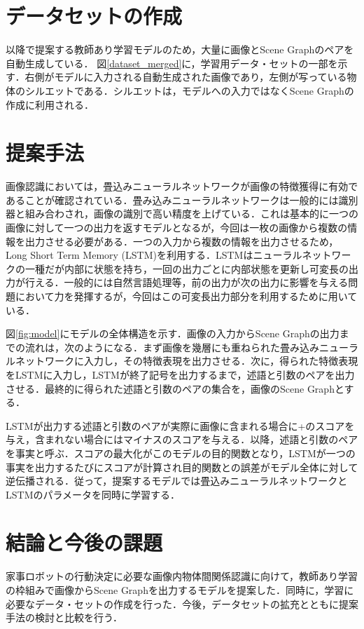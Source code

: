 \section{データセットの作成}
以降で提案する教師あり学習モデルのため，大量に画像とScene Graphのペアを自動生成している．
図\ref{dataset_merged}に，学習用データ・セットの一部を示す．右側がモデルに入力される自動生成された画像であり，左側が写っている物体のシルエットである．シルエットは，モデルへの入力ではなくScene Graphの作成に利用される．
\section{提案手法}
画像認識においては，畳込みニューラルネットワークが画像の特徴獲得に有効であることが確認されている．畳み込みニューラルネットワークは一般的には識別器と組み合わされ，画像の識別で高い精度を上げている．これは基本的に一つの画像に対して一つの出力を返すモデルとなるが，今回は一枚の画像から複数の情報を出力させる必要がある．一つの入力から複数の情報を出力させるため，Long Short Term Memory (LSTM)\cite{lstm}を利用する．LSTMはニューラルネットワークの一種だが内部に状態を持ち，一回の出力ごとに内部状態を更新し可変長の出力が行える．一般的には自然言語処理等，前の出力が次の出力に影響を与える問題において力を発揮するが，今回はこの可変長出力部分を利用するために用いている．

図\ref{fig:model}にモデルの全体構造を示す．画像の入力からScene Graphの出力までの流れは，次のようになる．まず画像を幾層にも重ねられた畳み込みニューラルネットワークに入力し，その特徴表現を出力させる．次に，得られた特徴表現をLSTMに入力し，LSTMが終了記号を出力するまで，述語と引数のペアを出力させる．最終的に得られた述語と引数のペアの集合を，画像のScene Graphとする．

LSTMが出力する述語と引数のペアが実際に画像に含まれる場合に+のスコアを与え，含まれない場合にはマイナスのスコアを与える．以降，述語と引数のペアを事実と呼ぶ．スコアの最大化がこのモデルの目的関数となり，LSTMが一つの事実を出力するたびにスコアが計算され目的関数との誤差がモデル全体に対して逆伝播される．従って，提案するモデルでは畳込みニューラルネットワークとLSTMのパラメータを同時に学習する．
\section{結論と今後の課題}
家事ロボットの行動決定に必要な画像内物体間関係認識に向けて，教師あり学習の枠組みで画像からScene Graphを出力するモデルを提案した．同時に，学習に必要なデータ・セットの作成を行った．今後，データセットの拡充とともに提案手法の検討と比較を行う．


